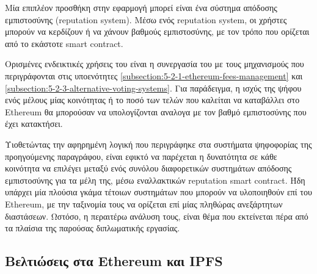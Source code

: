 Μία επιπλέον προσθήκη στην εφαρμογή μπορεί είναι ένα σύστημα απόδοσης εμπιστοσύνης (reputation system). Μέσω ενός reputation system, οι χρήστες μπορούν να κερδίζουν ή να χάνουν βαθμούς εμπιστοσύνης, με τον τρόπο που ορίζεται από το εκάστοτε smart contract.

Ορισμένες ενδεικτικές χρήσεις του είναι η συνεργασία του με τους μηχανισμούς που περιγράφονται στις υποενότητες \ref{subsection:5-2-1-ethereum-fees-management} και \ref{subsection:5-2-3-alternative-voting-systems}. Για παράδειγμα, η ισχύς της ψήφου ενός μέλους μίας κοινότητας ή το ποσό των τελών που καλείται να καταβάλλει στο Ethereum θα μπορούσαν να υπολογίζονται αναλογα με τον βαθμό εμπιστοσύνης που έχει κατακτήσει.

Υιοθετώντας την αφηρημένη λογική που περιγράφηκε στα συστήματα ψηφοφορίας της προηγούμενης παραγράφου, είναι εφικτό να παρέχεται η δυνατότητα σε κάθε κοινότητα να επιλέγει μεταξύ ενός συνόλου διαφορετικών συστημάτων απόδοσης εμπιστοσύνης για τα μέλη της, μέσω εναλλακτικών reputation smart contract. Ήδη υπάρχει μία πλούσια γκάμα τέτοιων συστημάτων που μπορούν να υλοποιηθούν επί του Ethereum, με την ταξινομία τους να ορίζεται επί μίας πληθώρας ανεξάρτητων διαστάσεων.\cite{5.2-taxonomy-of-reputation-systems} Ωστόσο, η περαιτέρω ανάλυση τους, είναι θέμα που εκτείνεται πέρα από τα πλαίσια της παρούσας διπλωματικής εργασίας.

\subsection{Βελτιώσεις στα Ethereum και IPFS}\label{subsection:5-2-5-ethereum-ipfs-improvements}
